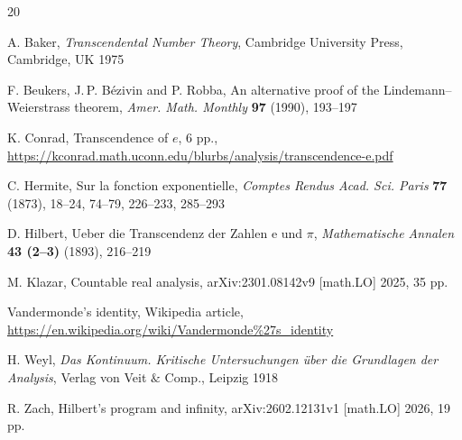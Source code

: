 \documentclass[10pt]{article}
\begin{document}
\begin{thebibliography}{20}

A. Baker, {\em Transcendental Number Theory}, Cambridge University Press,
Cambridge, UK 1975

F. Beukers, J.\,P. B\'ezivin and P. Robba, 
An alternative proof of the Lindemann--Weierstrass theorem, {\em Amer. 
Math. Monthly} {\bf 97} (1990), 193--197

K. Conrad, Transcendence of $e$, 6 pp., \url{https://kconrad.math.uconn.edu/blurbs/analysis/transcendence-e.pdf}

C. Hermite, Sur la fonction exponentielle, {\em Comptes Rendus Acad. Sci. Paris } {\bf 77} (1873), 18--24, 74--79, 226--233, 285--293 

D. Hilbert, Ueber die Transcendenz der Zahlen $\mathrm{e}$ und $\pi$, {\em Mathematische
Annalen} {\bf 43 (2--3)} (1893), 216--219

M. Klazar, Countable real analysis, arXiv:2301.08142v9 
[math.LO] 2025, 35 pp.


Vandermonde's identity, Wikipedia article, \url{https://en.wikipedia.org/wiki/Vandermonde%27s_identity}

H. Weyl, {\em Das Kontinuum. Kritische Untersuchungen \"uber die Grundlagen der Analysis}, Verlag von Veit $\&$ Comp., 
Leipzig 1918

 R. Zach, Hilbert's program and infinity,  arXiv:2602.12131v1 [math.LO] 2026, 19 pp.   
    
\end{thebibliography}
\end{document}
